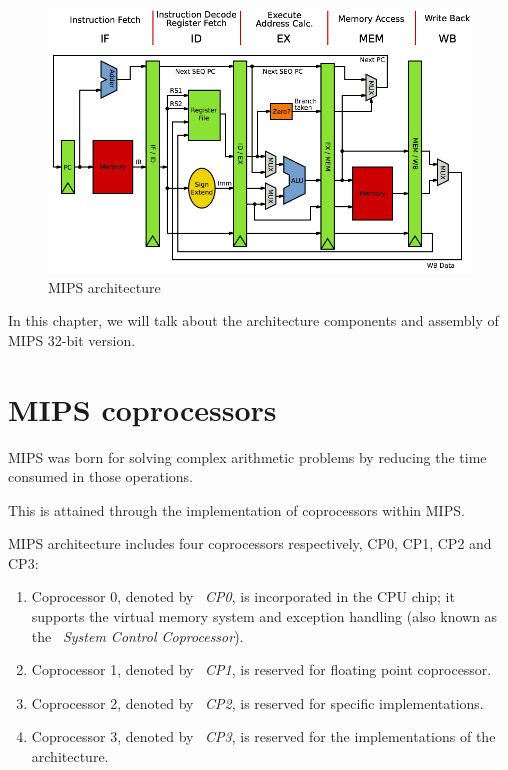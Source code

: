 \documentclass[
  oneside,
  11pt, a4paper,
  footinclude=true,
  headinclude=true,
  cleardoublepage=empty
]{scrbook}
\begin{document}
\begin{figure}[h!]
  \centering
    \includegraphics[width=1\textwidth]{img/MIPSarchitecture.png}
    \caption{MIPS architecture} %
    \label{fig:MIPSarchitecture}
\end{figure}


\newpage

In this chapter, we will talk about the architecture components and assembly of MIPS 32-bit version.

\section{MIPS coprocessors}

MIPS was born for solving complex arithmetic problems by reducing the time consumed in those operations.

This is attained through the implementation of coprocessors within MIPS.

MIPS architecture includes four coprocessors respectively, CP0, CP1, CP2 and CP3:

\begin{enumerate}
\item Coprocessor 0, denoted by ~\textit{CP0}, is incorporated in the CPU chip; it supports the virtual memory system and exception handling (also known as the ~\textit{System Control Coprocessor}).
\item Coprocessor 1, denoted by ~\textit{CP1}, is reserved for floating point coprocessor.
\item Coprocessor 2, denoted by ~\textit{CP2}, is reserved for specific implementations.
\item Coprocessor 3, denoted by ~\textit{CP3}, is reserved for the implementations of the architecture.
\end{enumerate}
\end{document}
